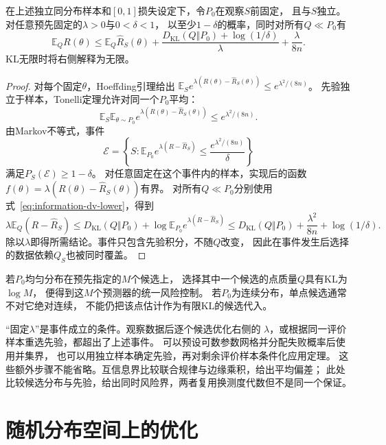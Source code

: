 \begin{theorem}
\label{thm:information-pac-bayes-basic}
在上述独立同分布样本和\([0,1]\)损失设定下，令\(P_0\)在观察\(S\)前固定，
且与\(S\)独立。对任意预先固定的\(\lambda>0\)与\(0<\delta<1\)，
以至少\(1-\delta\)的概率，同时对所有\(Q\ll P_0\)有
\begin{equation}
  \mathbb E_QR(\theta)
  \leq\mathbb E_Q\widehat R_S(\theta)
  +\frac{D_{\mathrm{KL}}(Q\Vert P_0)+\log(1/\delta)}{\lambda}
  +\frac{\lambda}{8n}.
  \label{eq:information-pac-bayes-basic}
\end{equation}
KL无限时将右侧解释为无限。
\end{theorem}
\begin{proof}
对每个固定\(\theta\)，Hoeffding引理给出
\(\mathbb E_Se^{\lambda(R(\theta)-\widehat R_S(\theta))}
\leq e^{\lambda^2/(8n)}\)。
先验独立于样本，Tonelli定理允许对同一个\(P_0\)平均：
\[
  \mathbb E_S\mathbb E_{\theta\sim P_0}
  e^{\lambda(R(\theta)-\widehat R_S(\theta))}
  \leq e^{\lambda^2/(8n)}.
\]
由Markov不等式，事件
\[
  \mathcal E=
  \left\{S:\mathbb E_{P_0}e^{\lambda(R-\widehat R_S)}
  \leq\frac{e^{\lambda^2/(8n)}}{\delta}\right\}
\]
满足\(P_S(\mathcal E)\geq1-\delta\)。
对任意固定在这个事件内的样本，实现后的函数
\(f(\theta)=\lambda(R(\theta)-\widehat R_S(\theta))\)有界。
对所有\(Q\ll P_0\)分别使用式~\eqref{eq:information-dv-lower}，得到
\[
  \lambda\mathbb E_Q(R-\widehat R_S)
  \leq D_{\mathrm{KL}}(Q\Vert P_0)
       +\log\mathbb E_{P_0}e^{\lambda(R-\widehat R_S)}
  \leq D_{\mathrm{KL}}(Q\Vert P_0)
       +\frac{\lambda^2}{8n}+\log(1/\delta).
\]
除以\(\lambda\)即得所需结论。事件只包含先验积分，不随\(Q\)改变，
因此在事件发生后选择的数据依赖\(Q_S\)也被同时覆盖。
\end{proof}

若\(P_0\)均匀分布在预先指定的\(M\)个候选上，
选择其中一个候选的点质量\(Q\)具有KL为\(\log M\)，
便得到这\(M\)个预测器的统一风险控制。
若\(P_0\)为连续分布，单点候选通常不对它绝对连续，
不能仍把该点估计作为有限KL的候选代入。

“固定\(\lambda\)”是事件成立的条件。观察数据后逐个候选优化右侧的
\(\lambda\)，或根据同一评价样本重选先验，都超出了上述事件。
可以预设可数参数网格并分配失败概率后使用并集界，
也可以用独立样本确定先验，再对剩余评价样本条件化应用定理。
这些额外步骤不能省略。互信息界比较联合规律与边缘乘积，给出平均偏差；
此处比较候选分布与先验，给出同时风险界，两者复用换测度代数但不是同一个保证。

\section{随机分布空间上的优化}
\label{sec:information-variational-learning}

